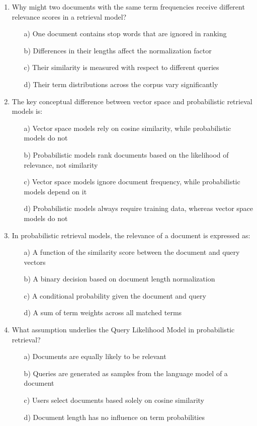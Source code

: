 \documentclass[8pt]{extarticle}
\begin{document}
\begin{multicols}{2}
\begin{enumerate}
\item Why might two documents with the same term frequencies receive different relevance scores in a retrieval model?
\begin{itemize}
    \item[a)] One document contains stop words that are ignored in ranking
    \item[b)] Differences in their lengths affect the normalization factor
    \item[c)] Their similarity is measured with respect to different queries
    \item[d)] Their term distributions across the corpus vary significantly
\end{itemize}
 

\item The key conceptual difference between vector space and probabilistic retrieval models is:
\begin{itemize}
    \item[a)] Vector space models rely on cosine similarity, while probabilistic models do not
    \item[b)] Probabilistic models rank documents based on the likelihood of relevance, not similarity
    \item[c)] Vector space models ignore document frequency, while probabilistic models depend on it
    \item[d)] Probabilistic models always require training data, whereas vector space models do not
\end{itemize}
 

\item In probabilistic retrieval models, the relevance of a document is expressed as:
\begin{itemize}
    \item[a)] A function of the similarity score between the document and query vectors
    \item[b)] A binary decision based on document length normalization
    \item[c)] A conditional probability given the document and query
    \item[d)] A sum of term weights across all matched terms
\end{itemize}
 

\item What assumption underlies the Query Likelihood Model in probabilistic retrieval?
\begin{itemize}
    \item[a)] Documents are equally likely to be relevant
    \item[b)] Queries are generated as samples from the language model of a document
    \item[c)] Users select documents based solely on cosine similarity
    \item[d)] Document length has no influence on term probabilities
\end{itemize}
 


\end{enumerate}
\end{multicols}
\end{document}
